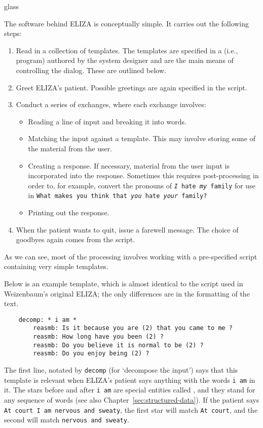 \begin{tblsfilledsymbol}{}{glass}
\begin{underthehood}

The software behind ELIZA is conceptually simple. 
It carries out the following steps:

\begin{enumerate}
\item Read in a collection of templates. The templates are
specified in a  (i.e., program) authored by the system designer and 
are the main means of controlling the dialog.  These are outlined below.
\item Greet ELIZA's patient. Possible greetings are again specified in
the script.
\item Conduct a series of exchanges, where each exchange involves:
  \begin{itemize}
    \item Reading a line of input and breaking it into words.
    \item Matching the input against a template. This may involve storing
      some of the material from the user. 
    \item Creating a response. If necessary, material from the user input is incorporated
      into the response. Sometimes this requires post-processing in order to, for example, 
      convert the pronouns of
\texttt{\emph{I} hate \emph{my} family} for use in 
\texttt{What makes you think that \emph{you} hate \emph{your} family?}
      \item Printing out the response.

  \end{itemize}
\item When the patient wants to quit, issue a farewell message. The choice of goodbyes again
comes from the script.
\end{enumerate}

As we can see, most of the processing involves working with a pre-specified script containing very simple templates.

Below is an example template, which is almost identical to the
script used in Weizenbaum's original ELIZA; the only differences are in the formatting of the text. 
\begin{verbatim}
	decomp: * i am *
	    reasmb: Is it because you are (2) that you came to me ?
	    reasmb: How long have you been (2) ?
	    reasmb: Do you believe it is normal to be (2) ?
	    reasmb: Do you enjoy being (2) ?
\end{verbatim}
The first line, notated by \texttt{decomp} (for `decompose the input') says that this template is relevant when ELIZA's patient says anything with the words \texttt{i am} in it.
The stars before and after \texttt{i am} are special entities called , and they stand for any sequence of words (see also Chapter~\ref{sec:structured-data}). 
If the patient says \texttt{At court I am nervous and sweaty}, the first star will match \texttt{At court}, and the second will match \texttt{nervous and sweaty}.


\end{underthehood}
\end{tblsfilledsymbol}
